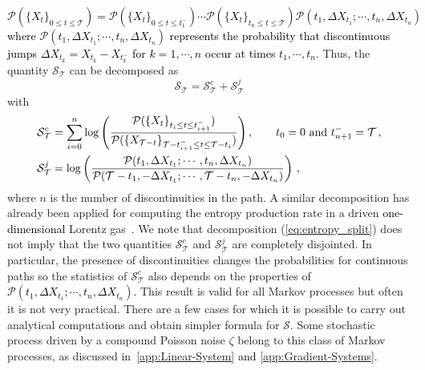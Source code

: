 \documentclass[12pt]{iopart}
\newcommand{\lx} {\left}
\newcommand{\rx} {\right}
\newcommand{\cP} {\mathcal{P}}
\newcommand{\cS} {\mathcal{S}}
\newcommand{\cT} {\mathcal{T}}
\begin{document}
\textcolor{black}{
\begin{equation}
\cP(\{X_t\}_{0\le t \le \cT})=\cP(\{X_t\}_{0\le t \le t_1^{-}})\cdots \cP(\{X_t\}_{t_n\le t \le \cT})\cP(t_1, \Delta X_{t_1}; \cdots,t_n,\Delta X_{t_n})
\label{eq:path_probability}
\end{equation}
where $\cP(t_1, \Delta X_{t_1}; \cdots,t_n,\Delta X_{t_n})$ represents the probability that discontinuous jumps $\Delta X_{t_k}=X_{t_k}-X_{t_k^-}$ for $k=1,\cdots,n$ occur at times $t_1,\cdots,t_n$. }
Thus, the quantity $\cS_\cT$ can be decomposed as
\begin{equation}
\cS_\cT = \cS_\cT^{c}+\cS_\cT^{j}
\label{eq:entropy_split}
\end{equation}
with
\begin{align}
&\cS_\cT^{c}=\sum_{i=0}^n \log\lx(\frac{\cP(\{X_t\}_{t_{i}\le t \le t_{i+1}^{-}})}{\cP(\{ X_{\cT -t}\}_{\cT-t_{i+1}^- \le t \le \cT-t_i})}\rx), \quad \quad t_0=0 \text{ and } t_{n+1}^{-}=\cT\,,\\
&\textcolor{black}{\cS_\cT^{j}=\log\lx(\frac{\cP(t_1, \Delta X_{t_1}; \cdots,t_n,\Delta X_{t_n})}{\cP(\cT-t_1, -\Delta X_{t_1}; \cdots,\cT-t_n,-\Delta X_{t_n})}\rx)\,,}
\end{align}
where $n$ is the number of discontinuities in the path. A similar decomposition has already been applied for computing the entropy production rate in a driven \textcolor{black}{one-dimensional} Lorentz gas~\cite{gradenigo2012nonequilibrium}. We note that decomposition (\ref{eq:entropy_split}) does not imply that the two quantities $\cS_\cT^{c}$ and $\cS_\cT^{j}$ are completely disjointed. %
In particular, the presence of discontinuities changes the probabilities for continuous paths so the statistics of $\cS_\cT^{c}$ also depends on the properties of \textcolor{black}{$\cP(t_1, \Delta X_{t_1}; \cdots,t_n,\Delta X_{t_n})$}. 
This result is valid for all Markov processes but often it is not very practical. There are a few cases for which it is possible to carry out analytical computations and obtain  simpler formula for $\cS$. Some stochastic process driven by a compound Poisson noise $\zeta$ belong to this class of Markov processes, as discussed in~\textcolor{black}{\ref{app:Linear-System} and \ref{app:Gradient-Systems}}.\\
\end{document}
